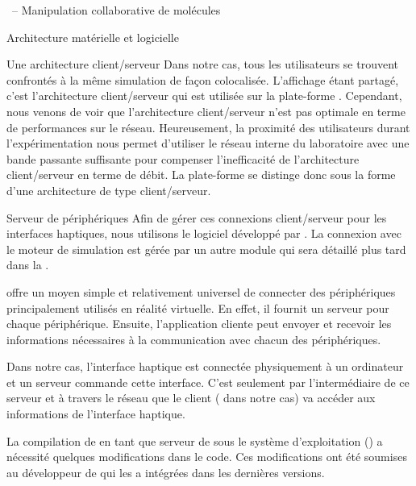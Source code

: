\documentclass[myfrancais]{mythesis}
\begin{document}
\begin{mychapter}{\myShaddock\ -- Manipulation collaborative de molécules}
\begin{mysection}{Architecture matérielle et logicielle}
\begin{mysubsection}{Une architecture client/serveur}
				Dans notre cas, tous les utilisateurs se trouvent confrontés à la même simulation de façon colocalisée.
				L'affichage étant partagé, c'est l'architecture client/serveur qui est utilisée sur la plate-forme \myShaddock.
				Cependant, nous venons de voir que l'architecture client/serveur n'est pas optimale en terme de performances sur le réseau.
				Heureusement, la proximité des utilisateurs durant l'expérimentation nous permet d'utiliser le réseau interne du laboratoire avec une bande passante suffisante pour compenser l'inefficacité de l'architecture client/serveur en terme de débit.
				La plate-forme \myShaddock se distinge donc sous la forme d'une architecture de type client/serveur.
				\begin{mysubsubsection}{Serveur de périphériques}
					Afin de gérer ces connexions client/serveur pour les interfaces haptiques, nous utilisons le logiciel  développé par .
					La connexion avec le moteur de simulation est gérée par un autre module qui sera détaillé plus tard dans la .

					 offre un moyen simple et relativement universel de connecter des périphériques principalement utilisés en réalité virtuelle.
					En effet, il fournit un serveur pour chaque périphérique.
					Ensuite, l'application cliente peut envoyer et recevoir les informations nécessaires à la communication avec chacun des périphériques.

					Dans notre cas, l'interface haptique est connectée physiquement à un ordinateur et un serveur  commande cette interface.
					C'est seulement par l'intermédiaire de ce serveur  et à travers le réseau que le client ( dans notre cas) va accéder aux informations de l'interface haptique.

					La compilation de  en tant que serveur de \myOmni sous le système d'exploitation \myLinux (\myUbuntu) a nécessité quelques modifications dans le code.
					Ces modifications ont été soumises au développeur de  qui les a intégrées dans les dernières versions.


\end{mysubsubsection}
\end{mysubsection}
\end{mysection}
\end{mychapter}
\end{document}
